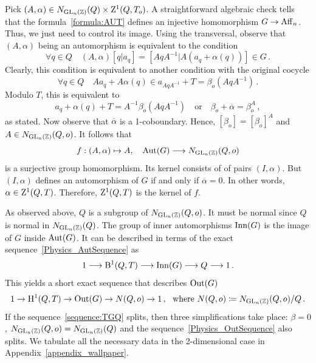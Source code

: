 \begin{just}
  Pick $(A,\alpha)\in N_{\operatorname{GL}_n ({\mathbb Z})}(Q)\times \mathrm{Z}^1 (Q,T_o)$.
  A straightforward algebraic check tells that  the formula~\eqref{formula:AUT} defines an injective homomorphism $G\to \operatorname{Aff}_n$.
  Thus, we just need to control its image. Using the transversal, observe that
  $(A,\alpha)$ being an automorphism is equivalent to the condition
  \[ \forall q\in Q \quad (A,\alpha) [q| a_q] = [ AqA^{-1} | A(a_q + \alpha (q)) ] \in G \, . \]
  Clearly, this condition is equivalent to another condition with the original cocycle
  \[ \forall q\in Q \quad Aa_q +A \alpha(q)\in  a_{AqA^{-1}} + T  = \beta_o (AqA^{-1}) \, . \]
  Modulo $T$, this is equivalent to
  \[a_q + \alpha(q)+ T = A^{-1}\beta_o (AqA^{-1}) \quad \mbox{or} \quad
\beta_o + \overline{\alpha} = \beta_o^A \, ,\]
as stated. Now observe that $\overline{\alpha}$ is a 1-coboundary. Hence, 
$[\beta_o]  = [\beta_o]^A$ and $A\in N_{\operatorname{GL}_n ({\mathbb Z})}(Q,o)$. It follows that
\[
f: (A,\alpha) \mapsto A, \quad \operatorname{Aut} (G) \longrightarrow   N_{\operatorname{GL}_n ({\mathbb Z})}(Q,o) 
\]
is a surjective group homomorphism. Its kernel consists of
of pairs $(I,\alpha)$. But $(I,\alpha)$ defines an automorphism of $G$ if and only if $\overline{\alpha}=0$. In other words,
$\alpha \in \mathrm{Z}^1 (Q,T)$. Therefore,  $\mathrm{Z}^1 (Q,T)$ is the kernel of $f$.
\end{just}


As observed above, $Q$ is a subgroup of $N_{\operatorname{GL}_n ({\mathbb Z})}(Q, o)$.
It must be normal since $Q$ is normal in $N_{\operatorname{GL}_n ({\mathbb Z})}(Q)$.
The group of inner automorphisms $\operatorname{Inn} (G)$ is the image of $G$ inside $\operatorname{Aut} (G)$.
It can be described in terms of the exact sequence~\eqref{Physics_AutSequence} as
\begin{equation} \label{Physics_InnSequence}
  1 \longrightarrow \mathrm{B}^1 (Q,T) \longrightarrow \operatorname{Inn} (G) \longrightarrow  Q \longrightarrow 1\, .
\end{equation} 
This yields a short exact sequence that describes $\operatorname{Out} (G)$ 
    \begin{equation} \label{Physics_OutSequence}
      1 \to \mathrm{H}^1 (Q,T) \to \operatorname{Out} (G) \to N(Q, o) \to 1\, , \ \mbox{ where } N(Q, o) \coloneqq N_{\operatorname{GL}_n ({\mathbb Z})}(Q, o)/Q \, .
      \end{equation}
    If the sequence~\eqref{sequence:TGQ} splits, then three simplifications take place:
    $\beta =0$, $N_{\operatorname{GL}_n ({\mathbb Z})}(Q, o) = N_{\operatorname{GL}_n ({\mathbb Z})}(Q)$ and the sequence~\eqref{Physics_OutSequence} also splits.
We tabulate all the necessary data in the 2-dimensional case in Appendix~\ref{appendix_wallpaper}.

